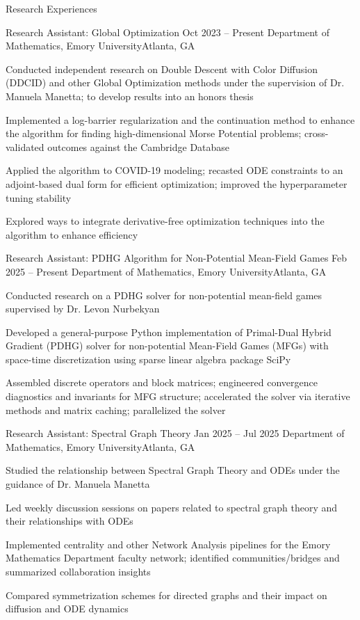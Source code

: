 \documentclass[10pt, letterpaper]{resume} %
\begin{document}
\begin{rSection}{Research Experiences}
\begin{rSubsection}
	{Research Assistant: Global Optimization}
	{Oct 2023 -- Present}
	{Department of Mathematics, Emory University}{Atlanta, GA}
	
	\item Conducted independent research on Double Descent with Color Diffusion (DDCID) and other Global Optimization methods under the supervision of Dr. Manuela Manetta; to develop results into an honors thesis
	\item Implemented a log-barrier regularization and the continuation method to enhance the algorithm for finding high-dimensional Morse Potential problems; cross-validated outcomes against the Cambridge Database
	\item Applied the algorithm to COVID-19 modeling; recasted ODE constraints to an adjoint-based dual form for efficient optimization; improved the hyperparameter tuning stability
	\item Explored ways to integrate derivative-free optimization techniques into the algorithm to enhance efficiency
\end{rSubsection}

\begin{rSubsection}
	{Research Assistant: PDHG Algorithm for Non-Potential Mean-Field Games}
	{Feb 2025 -- Present}
	{Department of Mathematics, Emory University}{Atlanta, GA}
	
	\item Conducted research on a PDHG solver for non-potential mean-field games supervised by Dr. Levon Nurbekyan
	\item Developed a general-purpose Python implementation of Primal-Dual Hybrid Gradient (PDHG) solver for non-potential Mean-Field Games (MFGs) with space-time discretization using sparse linear algebra package SciPy
	\item Assembled discrete operators and block matrices; engineered convergence diagnostics and invariants for MFG structure; accelerated the solver via iterative methods and matrix caching; parallelized the solver
\end{rSubsection}

\begin{rSubsection}
	{Research Assistant: Spectral Graph Theory}
	{Jan 2025 -- Jul 2025}
	{Department of Mathematics, Emory University}{Atlanta, GA}
	
	\item Studied the relationship between Spectral Graph Theory and  ODEs under the guidance of Dr. Manuela Manetta
	\item Led weekly discussion sessions on papers related to spectral graph theory and their relationships with ODEs 
	\item Implemented centrality and other Network Analysis pipelines for the Emory Mathematics Department faculty network; identified communities/bridges and summarized collaboration insights
	\item Compared symmetrization schemes for directed graphs and their impact on diffusion and ODE dynamics
\end{rSubsection}
\end{rSection} 
\end{document}
